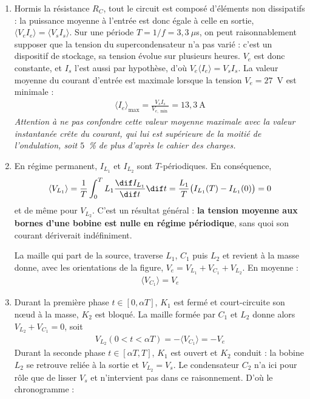 \begin{correction}

    \begin{enumerate}

        \item Hormis la résistance $R_C$, tout le circuit est composé d'éléments non dissipatifs : la puissance moyenne à l'entrée est donc égale à celle en sortie, $\langle V_eI_e\rangle=\langle V_sI_s\rangle$. Sur une période $T=1/f=3,3~\mu$s, on peut raisonnablement supposer que la tension du supercondensateur n'a pas varié : c'est un dispositif de stockage, sa tension évolue sur plusieurs heures. $V_e$ est donc constante, et $I_s$ l'est aussi par hypothèse, d'où $V_e\langle I_e\rangle=V_sI_s$. La valeur moyenne du courant d'entrée est maximale lorsque la tension $V_e=27$~V est minimale :
        \begin{align*}
            \boxed{\langle I_e\rangle_{\max}=\frac{V_sI_s}{V_{e,\min}}=13,3~\mathrm{A}}
        \end{align*}
        \textit{Attention à ne pas confondre cette valeur moyenne maximale avec la valeur instantanée crête du courant, qui lui est supérieure de la moitié de l'ondulation, soit $5$~\% de plus d'après le cahier des charges.}

        \item En régime permanent, $I_{L_1}$ et $I_{L_2}$ sont $T$-périodiques. En conséquence,
        \begin{align*}
            \langle V_{L_1}\rangle=\frac{1}{T}\int_0^T L_1\frac{\dif I_{L_1}}{\dif t}\dif t
            =\frac{L_1}{T}\big(I_{L_1}(T)-I_{L_1}(0)\big)
            =0
        \end{align*}
        et de même pour $V_{L_2}$. C'est un résultat général : \textbf{la tension moyenne aux bornes d'une bobine est nulle en régime périodique}, sans quoi son courant dériverait indéfiniment.

        La maille qui part de la source, traverse $L_1$, $C_1$ puis $L_2$ et revient à la masse donne, avec les orientations de la figure, $V_e=V_{L_1}+V_{C_1}+V_{L_2}$. En moyenne :
        \begin{align*}
            \boxed{\langle V_{C_1}\rangle=V_e}
        \end{align*}

        \item Durant la première phase $t\in[0,\alpha T]$, $K_1$ est fermé et court-circuite son n\oe ud à la masse, $K_2$ est bloqué. La maille formée par $C_1$ et $L_2$ donne alors $V_{L_2}+V_{C_1}=0$, soit
        \begin{align*}
            V_{L_2}(0<t<\alpha T)=-\langle V_{C_1}\rangle=-V_e
        \end{align*}
        Durant la seconde phase $t\in[\alpha T,T]$, $K_1$ est ouvert et $K_2$ conduit : la bobine $L_2$ se retrouve reliée à la sortie et $V_{L_2}=V_s$. Le condensateur $C_2$ n'a ici pour rôle que de lisser $V_s$ et n'intervient pas dans ce raisonnement. D'où le chronogramme :


\end{enumerate}
\end{correction}
